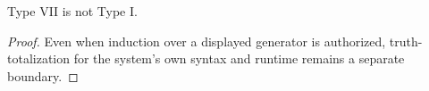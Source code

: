 \begin{corollary}
\label{cor:philosophy-self-truth-not-induction}
Type VII is not Type I.
\end{corollary}
\begin{proof}
Even when induction over a displayed generator is authorized,
truth-totalization for the system's own syntax and runtime remains a
separate boundary.
\end{proof}

